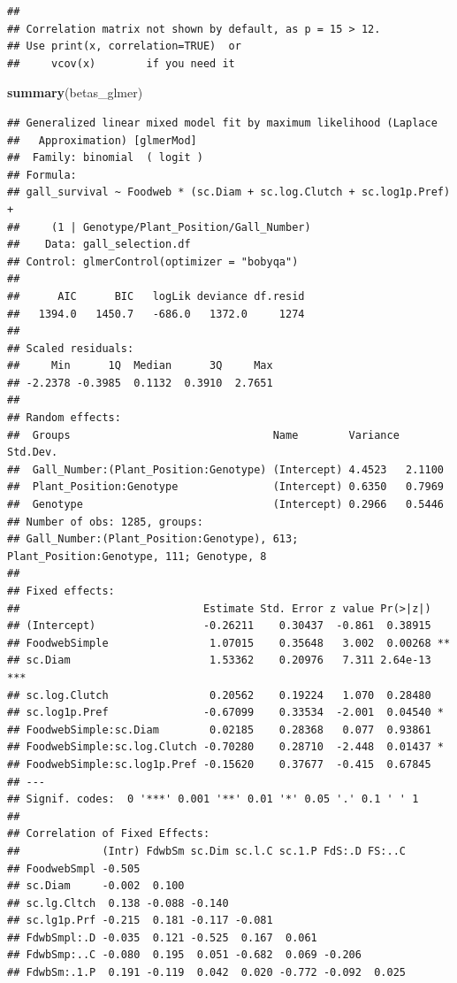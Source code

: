 \documentclass[]{elsarticle} %
\newenvironment{Shaded}{\begin{snugshade}}{\end{snugshade}}
\newcommand{\KeywordTok}[1]{\textcolor[rgb]{0.13,0.29,0.53}{\textbf{#1}}}
\newcommand{\NormalTok}[1]{#1}
\begin{document}
\begin{verbatim}
## 
## Correlation matrix not shown by default, as p = 15 > 12.
## Use print(x, correlation=TRUE)  or
##     vcov(x)        if you need it
\end{verbatim}

\begin{Shaded}
\begin{Highlighting}[]
\KeywordTok{summary}\NormalTok{(betas_glmer)}
\end{Highlighting}
\end{Shaded}

\begin{verbatim}
## Generalized linear mixed model fit by maximum likelihood (Laplace
##   Approximation) [glmerMod]
##  Family: binomial  ( logit )
## Formula: 
## gall_survival ~ Foodweb * (sc.Diam + sc.log.Clutch + sc.log1p.Pref) +  
##     (1 | Genotype/Plant_Position/Gall_Number)
##    Data: gall_selection.df
## Control: glmerControl(optimizer = "bobyqa")
## 
##      AIC      BIC   logLik deviance df.resid 
##   1394.0   1450.7   -686.0   1372.0     1274 
## 
## Scaled residuals: 
##     Min      1Q  Median      3Q     Max 
## -2.2378 -0.3985  0.1132  0.3910  2.7651 
## 
## Random effects:
##  Groups                                Name        Variance Std.Dev.
##  Gall_Number:(Plant_Position:Genotype) (Intercept) 4.4523   2.1100  
##  Plant_Position:Genotype               (Intercept) 0.6350   0.7969  
##  Genotype                              (Intercept) 0.2966   0.5446  
## Number of obs: 1285, groups:  
## Gall_Number:(Plant_Position:Genotype), 613; Plant_Position:Genotype, 111; Genotype, 8
## 
## Fixed effects:
##                             Estimate Std. Error z value Pr(>|z|)    
## (Intercept)                 -0.26211    0.30437  -0.861  0.38915    
## FoodwebSimple                1.07015    0.35648   3.002  0.00268 ** 
## sc.Diam                      1.53362    0.20976   7.311 2.64e-13 ***
## sc.log.Clutch                0.20562    0.19224   1.070  0.28480    
## sc.log1p.Pref               -0.67099    0.33534  -2.001  0.04540 *  
## FoodwebSimple:sc.Diam        0.02185    0.28368   0.077  0.93861    
## FoodwebSimple:sc.log.Clutch -0.70280    0.28710  -2.448  0.01437 *  
## FoodwebSimple:sc.log1p.Pref -0.15620    0.37677  -0.415  0.67845    
## ---
## Signif. codes:  0 '***' 0.001 '**' 0.01 '*' 0.05 '.' 0.1 ' ' 1
## 
## Correlation of Fixed Effects:
##             (Intr) FdwbSm sc.Dim sc.l.C sc.1.P FdS:.D FS:..C
## FoodwebSmpl -0.505                                          
## sc.Diam     -0.002  0.100                                   
## sc.lg.Cltch  0.138 -0.088 -0.140                            
## sc.lg1p.Prf -0.215  0.181 -0.117 -0.081                     
## FdwbSmpl:.D -0.035  0.121 -0.525  0.167  0.061              
## FdwbSmp:..C -0.080  0.195  0.051 -0.682  0.069 -0.206       
## FdwbSm:.1.P  0.191 -0.119  0.042  0.020 -0.772 -0.092  0.025
\end{verbatim}
\end{document}

